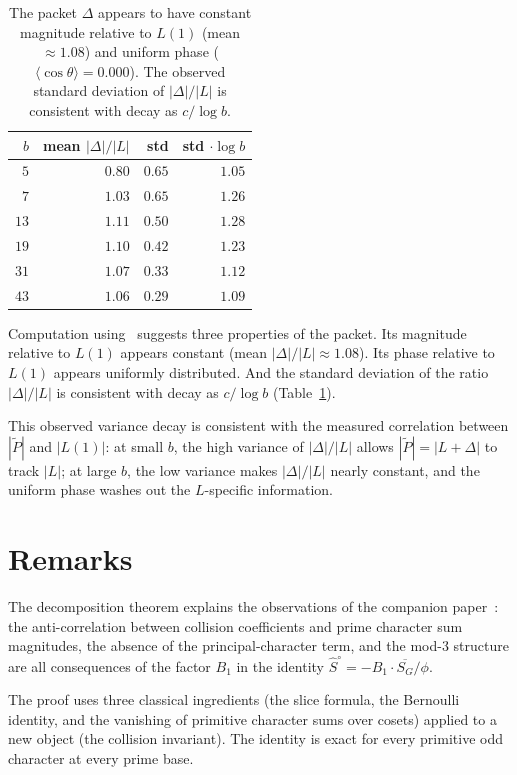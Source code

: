 \documentclass[12pt]{amsart}
\theoremstyle{definition}
\theoremstyle{remark}
\begin{document}
\begin{table}[h]
\centering
\begin{tabular}{rrrr}
\toprule
$b$ & mean $|\Delta|/|L|$ & std &
std $\cdot \log b$ \\
\midrule
$5$ & $0.80$ & $0.65$ & $1.05$ \\
$7$ & $1.03$ & $0.65$ & $1.26$ \\
$13$ & $1.11$ & $0.50$ & $1.28$ \\
$19$ & $1.10$ & $0.42$ & $1.23$ \\
$31$ & $1.07$ & $0.33$ & $1.12$ \\
$43$ & $1.06$ & $0.29$ & $1.09$ \\
\bottomrule
\end{tabular}
\caption{The packet $\Delta$ appears to have constant
magnitude relative to $L(1)$ (mean $\approx 1.08$)
and uniform phase
($\langle\cos\theta\rangle = 0.000$). The observed
standard deviation of $|\Delta|/|L|$ is consistent
with decay as $c/\log b$.}
\label{tab:apostol}
\end{table}

Computation using~\cite{nfield} suggests three
properties of the packet. Its magnitude relative to
$L(1)$ appears constant (mean
$|\Delta|/|L| \approx 1.08$). Its phase relative to
$L(1)$ appears uniformly distributed. And the standard
deviation of the ratio $|\Delta|/|L|$ is consistent
with decay as $c / \log b$ (Table~\ref{tab:apostol}).

This observed variance decay is consistent with the
measured correlation between
$|\widetilde{P}|$ and $|L(1)|$: at small $b$, the
high variance of $|\Delta|/|L|$ allows
$|\widetilde{P}| = |L + \Delta|$ to track $|L|$;
at large $b$, the low variance makes $|\Delta|/|L|$
nearly constant, and the uniform phase washes out
the $L$-specific information.

\section{Remarks}

The decomposition theorem explains the observations
of the companion paper~\cite{paperB}: the
anti-correlation between collision coefficients and
prime character sum magnitudes, the absence of the
principal-character term, and the mod-$3$ structure
are all consequences of the factor $B_1$ in the
identity
$\hat{S}^{\circ} = -B_1 \cdot \overline{S_G}/\phi$.

The proof uses three classical ingredients (the slice
formula, the Bernoulli identity, and the vanishing of
primitive character sums over cosets) applied to a new
object (the collision invariant). The identity is
exact for every primitive odd character at every prime
base.
\end{document}
